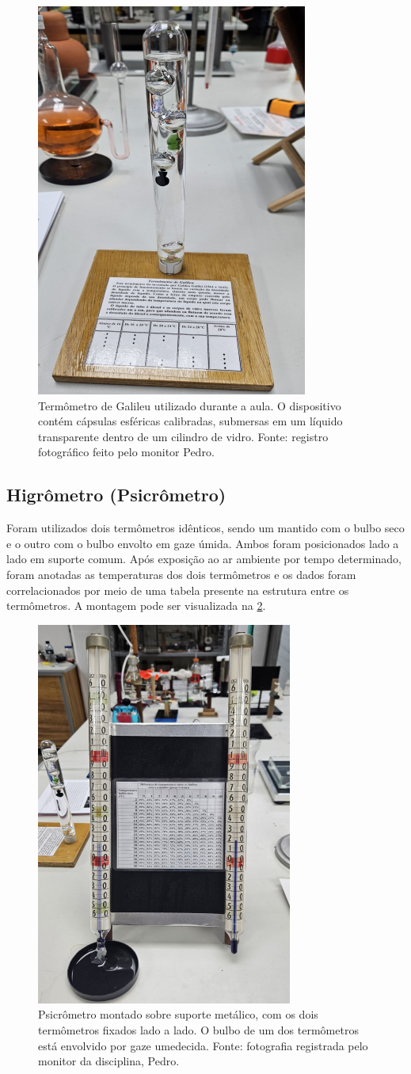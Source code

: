 \begin{figure}[H]
    \centering
    \includegraphics[width=0.25\linewidth]{fig/termometro.png}
    \caption{Termômetro de Galileu utilizado durante a aula. O dispositivo contém cápsulas esféricas calibradas, submersas em um líquido transparente dentro de um cilindro de vidro. Fonte: registro fotográfico feito pelo monitor Pedro.}
    \label{fig:termometro}
\end{figure}

\subsection{Higrômetro (Psicrômetro)}
Foram utilizados dois termômetros idênticos, sendo um mantido com o bulbo seco e o outro com o bulbo envolto em gaze úmida. Ambos foram posicionados lado a lado em suporte comum. Após exposição ao ar ambiente por tempo determinado, foram anotadas as temperaturas dos dois termômetros e os dados foram correlacionados por meio de uma tabela presente na estrutura entre os termômetros. A montagem pode ser visualizada na \cref{fig:psicrometro}.

\begin{figure}[H]
    \centering
    \includegraphics[width=0.30\linewidth]{fig/psicrometro.png}
    \caption{Psicrômetro montado sobre suporte metálico, com os dois termômetros fixados lado a lado. O bulbo de um dos termômetros está envolvido por gaze umedecida. Fonte: fotografia registrada pelo monitor da disciplina, Pedro.}
    \label{fig:psicrometro}
\end{figure}

